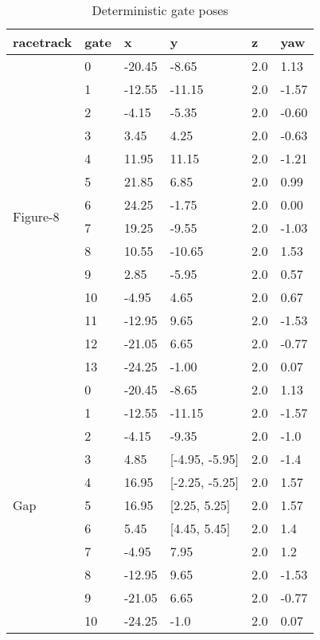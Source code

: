 \begin{table}[h]
    \footnotesize
    \caption{Deterministic gate poses\label{tab:gate_pos}}
    \centering
    \begin{tabular}{|l|l|l|l|l|l|}
    \hline
    racetrack & gate & x & y & z & yaw\\ 
    \hline
    \hline
    \multirow{14}{*}{Figure-8}   
    &0 &-20.45& -8.65&2.0& 1.13\\ \cline{2-6}
    &1 &-12.55&-11.15&2.0&-1.57\\ \cline{2-6}
    &2 &-4.15 & -5.35&2.0&-0.60\\ \cline{2-6}
    &3 &3.45  &  4.25&2.0&-0.63\\ \cline{2-6}
    &4 &11.95 & 11.15&2.0&-1.21\\ \cline{2-6}
    &5 &21.85 &  6.85&2.0& 0.99\\ \cline{2-6}
    &6 &24.25 & -1.75&2.0& 0.00\\ \cline{2-6}
    &7 &19.25 & -9.55&2.0&-1.03\\ \cline{2-6}
    &8 &10.55 &-10.65&2.0& 1.53\\ \cline{2-6}
    &9 &2.85  & -5.95&2.0& 0.57\\ \cline{2-6}
    &10&-4.95 &  4.65&2.0& 0.67\\ \cline{2-6}
    &11&-12.95&  9.65&2.0&-1.53\\ \cline{2-6}
    &12&-21.05&  6.65&2.0&-0.77\\ \cline{2-6}
    &13&-24.25& -1.00&2.0& 0.07\\
    \hline
    \hline
    \multirow{14}{*}{Gap}   
    &0 &-20.45&-8.65         &2.0& 1.13\\ \cline{2-6}
    &1 &-12.55&-11.15        &2.0&-1.57\\ \cline{2-6}
    &2 &-4.15 &-9.35         &2.0& -1.0\\ \cline{2-6}
    &3 &4.85  &[-4.95, -5.95]&2.0& -1.4\\ \cline{2-6}
    &4 &16.95 &[-2.25, -5.25]&2.0& 1.57\\ \cline{2-6}
    &5 &16.95 &[2.25,   5.25]&2.0& 1.57\\ \cline{2-6}
    &6 &5.45  &[4.45,   5.45]&2.0&  1.4\\ \cline{2-6}
    &7 &-4.95 &7.95          &2.0&  1.2\\ \cline{2-6}
    &8 &-12.95&9.65          &2.0&-1.53\\ \cline{2-6}
    &9 &-21.05&6.65          &2.0&-0.77\\ \cline{2-6}
    &10&-24.25&-1.0          &2.0& 0.07\\
    \hline
    \end{tabular}
    \end{table}






